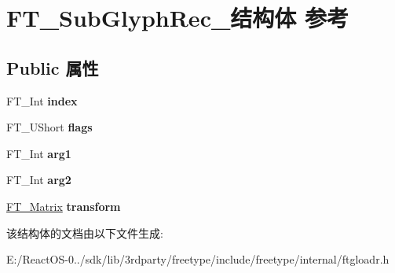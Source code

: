\hypertarget{struct_f_t___sub_glyph_rec__}{}\section{F\+T\+\_\+\+Sub\+Glyph\+Rec\+\_\+结构体 参考}
\label{struct_f_t___sub_glyph_rec__}
\subsection*{Public 属性}
\begin{DoxyCompactItemize}
\item 
\mbox{\label{struct_f_t___sub_glyph_rec___aa4febc2d867ff074ac116b068f372d3a}} 
F\+T\+\_\+\+Int {\bfseries index}
\item 
\mbox{\label{struct_f_t___sub_glyph_rec___a2d02aefc16061f7e039f76074518f6e5}} 
F\+T\+\_\+\+U\+Short {\bfseries flags}
\item 
\mbox{\label{struct_f_t___sub_glyph_rec___ad9f6b04ef50e1b39db90331e76f38206}} 
F\+T\+\_\+\+Int {\bfseries arg1}
\item 
\mbox{\label{struct_f_t___sub_glyph_rec___a0d27a8b473379cedeb061f9ecd7e97da}} 
F\+T\+\_\+\+Int {\bfseries arg2}
\item 
\mbox{\label{struct_f_t___sub_glyph_rec___a3c5fc1959a357c6c2b970ec2118d2683}} 
\hyperlink{struct_f_t___matrix__}{F\+T\+\_\+\+Matrix} {\bfseries transform}
\end{DoxyCompactItemize}


该结构体的文档由以下文件生成\+:\begin{DoxyCompactItemize}
\item 
E\+:/\+React\+O\+S-\/0../sdk/lib/3rdparty/freetype/include/freetype/internal/ftgloadr.\+h\end{DoxyCompactItemize}
